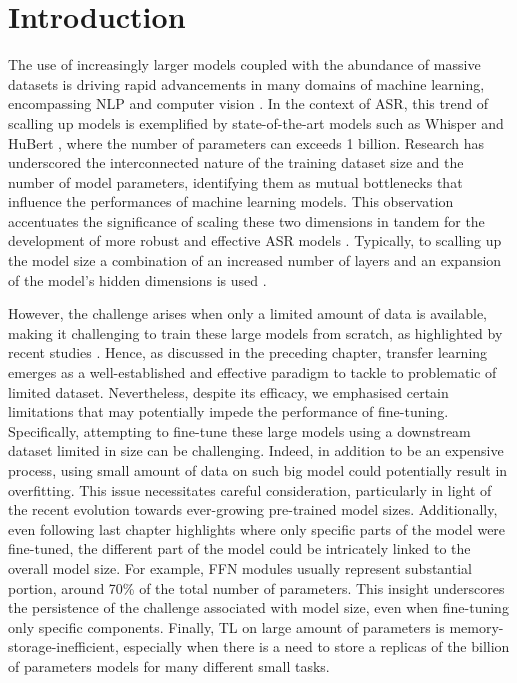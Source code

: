 \label{chap:5}
\cleardoublepage

\section{Introduction}
The use of increasingly larger models coupled with the abundance of massive datasets is driving rapid advancements in many domains of machine learning, encompassing \ac{NLP} \cite{brown2020language} and computer vision \cite{ramesh2021zero}. In the context of \ac{ASR}, this trend of scalling up models is exemplified by state-of-the-art models such as Whisper \cite{radford2023robust} and HuBert \cite{hsu2021hubert}, where the number of parameters can exceeds 1 billion. Research has underscored the interconnected nature of the training dataset size and the number of model parameters, identifying them as mutual bottlenecks that influence the performances of machine learning models. This observation accentuates the significance of scaling these two dimensions in tandem for the development of more robust and effective \ac{ASR} models \cite{Kaplan2020ScalingLF}. Typically, to scalling up the model size a combination of an increased number of layers and an expansion of the model's hidden dimensions is used \cite{zheng22d_interspeech}.

However, the challenge arises when only a limited amount of data is available, making it challenging to train these large models from scratch, as highlighted by recent studies \cite{sri_end2end, gelin2021endtoend}. Hence, as discussed in the preceding chapter, transfer learning emerges as a well-established and effective paradigm to tackle to problematic of limited dataset. Nevertheless, despite its efficacy, we emphasised certain limitations that may potentially impede the performance of fine-tuning. Specifically, attempting to fine-tune these large models using a downstream dataset limited in size can be challenging. Indeed, in addition to be an expensive process, using small amount of data on such big model could potentially result in overfitting. This issue necessitates careful consideration, particularly in light of the recent evolution towards ever-growing pre-trained model sizes. Additionally, even following last chapter highlights where only specific parts of the model were fine-tuned, the different part of the model could be intricately linked to the overall model size. For example, \ac{FFN} modules usually represent substantial portion, around 70\% of the total number of parameters. This insight underscores the persistence of the challenge associated with model size, even when fine-tuning only specific components. Finally, TL on large amount of parameters is memory-storage-inefficient, especially when there is a need to store a replicas of the billion of parameters models for many different small tasks.

